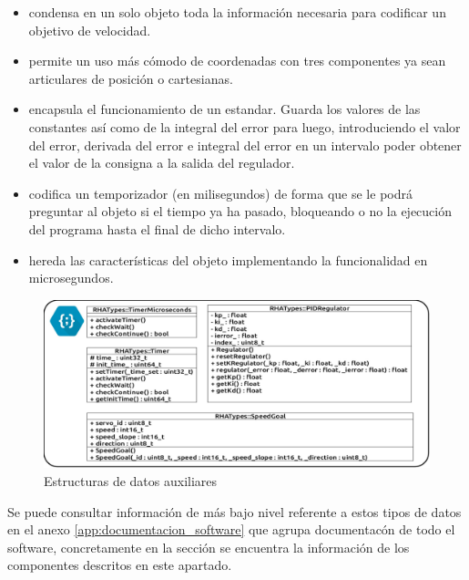        \begin{itemize}
            \item {} condensa en un solo objeto toda la información necesaria para codificar un objetivo de velocidad.
            \item {} permite un uso más cómodo de coordenadas con tres componentes ya sean articulares de posición o cartesianas.
            \item {} encapsula el funcionamiento de un  estandar. Guarda los valores de las constantes así como de la integral del error para luego, introduciendo el valor del error, derivada del error e integral del error en un intervalo poder obtener el valor de la consigna a la salida del regulador.
            \item {} codifica un temporizador (en milisegundos) de forma que se le podrá preguntar al objeto si el tiempo ya ha pasado, bloqueando o no la ejecución del programa hasta el final de dicho intervalo.
            \item {} hereda las características del objeto  implementando la funcionalidad en microsegundos.
        \end{itemize}

        \begin{figure}[H]
            \centering
            \includegraphics[width=1\textwidth]{figuras/Imagenes_SW/class_diagram_TRHA.jpg}
            \caption{Estructuras de datos auxiliares}
            \label{fig:SW:class_diagram_TRHA}
        \end{figure}

        Se puede consultar información de más bajo nivel referente a estos tipos de datos en el anexo \ref{app:documentacion_software} que agrupa documentacón de todo el software, concretamente en la sección \completar se encuentra la información de los componentes descritos en este apartado.

